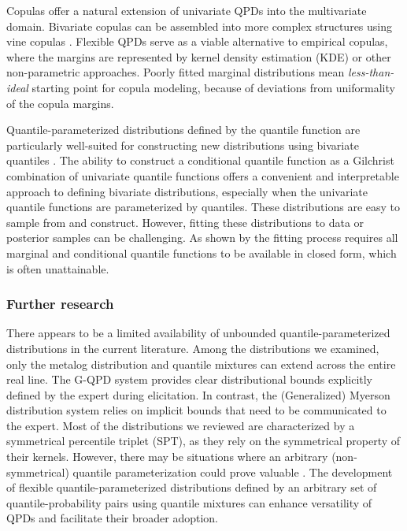 \documentclass[
  fleqn,
  deca,
  blindrev
]{informs4}
\begin{document}
Copulas offer a natural extension of univariate QPDs into the
multivariate domain. Bivariate copulas can be assembled into more
complex structures using vine copulas
\citep{czado2019AnalyzingDependentData, kurowicka2011DependenceModelingVine, wilson2018SpecificationInformativePrior}.
Flexible QPDs serve as a viable alternative to empirical copulas, where
the margins are represented by kernel density estimation (KDE) or other
non-parametric approaches. Poorly fitted marginal distributions mean
\emph{less-than-ideal} starting point for copula modeling, because of
deviations from uniformality of the copula margins.

Quantile-parameterized distributions defined by the quantile function
are particularly well-suited for constructing new distributions using
bivariate quantiles
\citep{nair2023PropertiesBivariateDistributions, vineshkumar2019BivariateQuantileFunctions}.
The ability to construct a conditional quantile function as a Gilchrist
combination of univariate quantile functions offers a convenient and
interpretable approach to defining bivariate distributions, especially
when the univariate quantile functions are parameterized by quantiles.
These distributions are easy to sample from and construct. However,
fitting these distributions to data or posterior samples can be
challenging. As shown by \citep{castillo1997FittingContinuousBivariate}
the fitting process requires all marginal and conditional quantile
functions to be available in closed form, which is often unattainable.

\subsubsection*{Further research}\label{further-research}

There appears to be a limited availability of unbounded
quantile-parameterized distributions in the current literature. Among
the distributions we examined, only the metalog distribution and
quantile mixtures can extend across the entire real line. The G-QPD
system provides clear distributional bounds explicitly defined by the
expert during elicitation. In contrast, the (Generalized) Myerson
distribution system relies on implicit bounds that need to be
communicated to the expert. Most of the distributions we reviewed are
characterized by a symmetrical percentile triplet (SPT), as they rely on
the symmetrical property of their kernels. However, there may be
situations where an arbitrary (non-symmetrical) quantile
parameterization could prove valuable \citep[as shown
by][]{perepolkin2021HybridElicitationIndirect}. The development of
flexible quantile-parameterized distributions defined by an arbitrary
set of quantile-probability pairs using quantile mixtures
\citep{peng2023MixtureQuantilesEstimated} can enhance versatility of
QPDs and facilitate their broader adoption.
\end{document}
